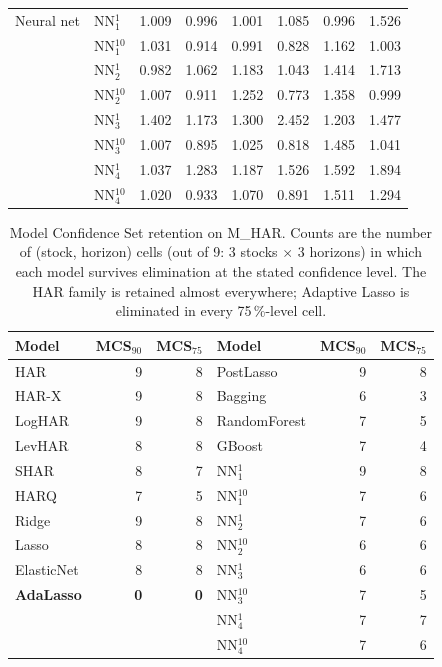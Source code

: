 \documentclass[twocolumn,9pt]{extarticle}
\begin{document}
\begin{table}[H]
\begin{tabular}{ll|rr|rr|rr}
\midrule
Neural net   & NN$_1^{1}$   & 1.009 & 0.996 & 1.001 & 1.085 & 0.996 & 1.526 \\
             & NN$_1^{10}$  & 1.031 & 0.914 & 0.991 & 0.828 & 1.162 & 1.003 \\
             & NN$_2^{1}$   & 0.982 & 1.062 & 1.183 & 1.043 & 1.414 & 1.713 \\
             & NN$_2^{10}$  & 1.007 & 0.911 & 1.252 & 0.773 & 1.358 & 0.999 \\
             & NN$_3^{1}$   & 1.402 & 1.173 & 1.300 & 2.452 & 1.203 & 1.477 \\
             & NN$_3^{10}$  & 1.007 & 0.895 & 1.025 & 0.818 & 1.485 & 1.041 \\
             & NN$_4^{1}$   & 1.037 & 1.283 & 1.187 & 1.526 & 1.592 & 1.894 \\
             & NN$_4^{10}$  & 1.020 & 0.933 & 1.070 & 0.891 & 1.511 & 1.294 \\
\bottomrule
\end{tabular}
\end{table}

\begin{table}[H]
\centering\small
\caption{Model Confidence Set retention on M\_HAR. Counts are the
number of (stock, horizon) cells (out of 9: 3 stocks $\times$ 3
horizons) in which each model survives elimination at the stated
confidence level. The HAR family is retained almost everywhere;
Adaptive Lasso is eliminated in every 75\,\%-level cell.}
\label{tab:mcs}
\begin{tabular}{lrr|lrr}
\toprule
Model & MCS$_{90}$ & MCS$_{75}$ & Model & MCS$_{90}$ & MCS$_{75}$ \\
\midrule
HAR          & 9 & 8 & PostLasso   & 9 & 8 \\
HAR-X        & 9 & 8 & Bagging     & 6 & 3 \\
LogHAR       & 9 & 8 & RandomForest& 7 & 5 \\
LevHAR       & 8 & 8 & GBoost      & 7 & 4 \\
SHAR         & 8 & 7 & NN$_1^{1}$  & 9 & 8 \\
HARQ         & 7 & 5 & NN$_1^{10}$ & 7 & 6 \\
Ridge        & 9 & 8 & NN$_2^{1}$  & 7 & 6 \\
Lasso        & 8 & 8 & NN$_2^{10}$ & 6 & 6 \\
ElasticNet   & 8 & 8 & NN$_3^{1}$  & 6 & 6 \\
\textbf{AdaLasso}    & \textbf{0} & \textbf{0} & NN$_3^{10}$ & 7 & 5 \\
             &   &   & NN$_4^{1}$  & 7 & 7 \\
             &   &   & NN$_4^{10}$ & 7 & 6 \\
\bottomrule
\end{tabular}
\end{table}
\end{document}

